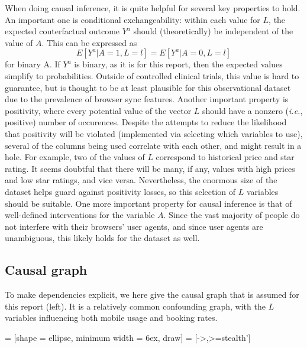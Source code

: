 \documentclass{article}
\begin{document}
When doing causal inference, it is quite helpful for several key properties to
hold.  An important one is conditional exchangeability: within each value for
$L$, the expected couterfactual outcome $Y^a$ should (theoretically) be
independent of the value of $A$.  This can be expressed as
\[
E[Y^a | A=1, L=l] = E[Y^a | A=0, L=l]
\]
for binary A.  If $Y^a$ is binary, as it is for this report, then the expected
values simplify to probabilities.  Outside of controlled clinical trials, this
value is hard to guarantee, but is thought to be at least plausible for this
observational dataset due to the prevalence of browser sync features.  Another
important property is positivity, where every potential value of the vector $L$
should have a nonzero (\emph{i.e.}, positive) number of occurences.  Despite the
attempts to reduce the likelihood that positivity will be violated (implemented
via selecting which variables to use), several of the columns being used
correlate with each other, and might result in a hole.  For example, two of the
values of $L$ correspond to historical price and star rating.  It seems doubtful
that there will be many, if any, values with high prices and low star ratings,
and vice versa.  Nevertheless, the enormous size of the dataset helps guard
against positivity losses, so this selection of $L$ variables should be
suitable.  One more important property for causal inference is that of
well-defined interventions for the variable $A$.  Since the vast majority of
people do not interfere with their browsers' user agents, and since user agents
are unambiguous, this likely holds for the dataset as well.

\subsection{Causal graph}

To make dependencies explicit, we here give the causal graph that is assumed for
this report (left).  It is a relatively common confounding graph, with the $L$
variables influencing both mobile usage and booking rates.

 = [shape = ellipse, minimum width = 6ex, draw]
   = [->,>=stealth']

\begin{center}
  \hspace{5em}
\end{center}
\end{document}
